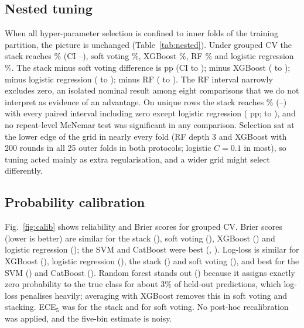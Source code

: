 \documentclass[11pt,a4paper]{article}
\begin{document}
\subsection{Nested tuning}\label{sec:nested}
When all hyper-parameter selection is confined to inner folds of the training partition, the picture is unchanged (Table~\ref{tab:nested}). Under grouped CV the stack reaches \NAccStackG\% (CI \NCIloStackG--\NCIhiStackG), soft voting \NAccVoteG\%, XGBoost \NAccXGBG\%, RF \NAccRFG\% and logistic regression \NAccLRG\%. The stack minus soft voting difference is \NDiffVoteG{} pp (CI \NDiffLoVoteG{} to \NDiffHiVoteG); minus XGBoost \NDiffXGBG{} (\NDiffLoXGBG{} to \NDiffHiXGBG); minus logistic regression \NDiffLRG{} (\NDiffLoLRG{} to \NDiffHiLRG); minus RF \NDiffRFG{} (\NDiffLoRFG{} to \NDiffHiRFG). The RF interval narrowly excludes zero, an isolated nominal result among eight comparisons that we do not interpret as evidence of an advantage. On unique rows the stack reaches \NAccStackD\% (\NCIloStackD--\NCIhiStackD) with every paired interval including zero except logistic regression (\NDiffLRD{} pp; \NDiffLoLRD{} to \NDiffHiLRD), and no repeat-level McNemar test was significant in any comparison. Selection sat at the lower edge of the grid in nearly every fold (RF depth 3 and XGBoost with 200 rounds in all 25 outer folds in both protocols; logistic $C=0.1$ in most), so tuning acted mainly as extra regularisation, and a wider grid might select differently.

\begin{table}[t]\centering\small
\caption{Repeated nested CV (5 repeats $\times$ 5 outer folds; inner 3-fold grouped selection on training partitions only).}\label{tab:nested}

\end{table}

\subsection{Probability calibration}\label{sec:calib}
Fig.~\ref{fig:calib} shows reliability and Brier scores for grouped CV. Brier scores (lower is better) are similar for the stack (\BrierStackG), soft voting (\BrierVoteG), XGBoost (\BrierXGBG) and logistic regression (\BrierLRG); the SVM and CatBoost were best (\BrierSVMG, \BrierCatG). Log-loss is similar for XGBoost (\LlXGBG), logistic regression (\LlLRG), the stack (\LlStackG) and soft voting (\LlVoteG), and best for the SVM (\LlSVMG) and CatBoost (\LlCatG). Random forest stands out (\LlRFG) because it assigns exactly zero probability to the true class for about 3\% of held-out predictions, which log-loss penalises heavily; averaging with XGBoost removes this in soft voting and stacking. ECE$_5$ was \EceStackG{} for the stack and \EceVoteG{} for soft voting. No post-hoc recalibration was applied, and the five-bin estimate is noisy.
\end{document}
